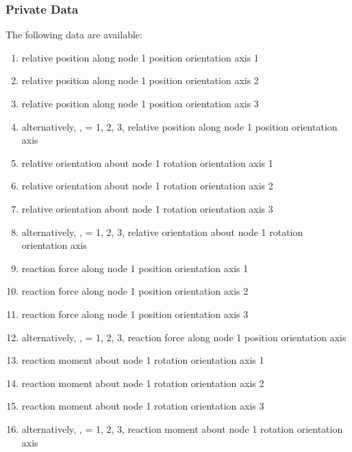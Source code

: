 \subsubsection{Private Data}
The following data are available:
\begin{enumerate}
\item {} relative position along node 1 position orientation axis 1
\item {} relative position along node 1 position orientation axis 2
\item {} relative position along node 1 position orientation axis 3

\item[-] alternatively, ,  = 1, 2, 3, relative position along node 1 position orientation axis 

\item {} relative orientation about node 1 rotation orientation axis 1
\item {} relative orientation about node 1 rotation orientation axis 2
\item {} relative orientation about node 1 rotation orientation axis 3

\item[-] alternatively, ,  = 1, 2, 3, relative orientation about node 1 rotation orientation axis 

\item {} reaction force along node 1 position orientation axis 1
\item {} reaction force along node 1 position orientation axis 2
\item {} reaction force along node 1 position orientation axis 3

\item[-] alternatively, ,  = 1, 2, 3, reaction force along node 1 position orientation axis 

\item {} reaction moment about node 1 rotation orientation axis 1
\item {} reaction moment about node 1 rotation orientation axis 2
\item {} reaction moment about node 1 rotation orientation axis 3

\item[-] alternatively, ,  = 1, 2, 3, reaction moment about node 1 rotation orientation axis 


\end{enumerate}
